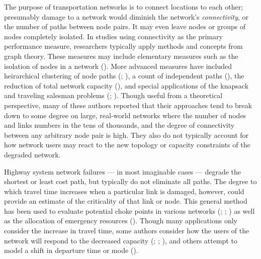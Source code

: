 \documentclass[]{ascelike-new}
\begin{document}
The purpose of transportation networks is to connect locations to each
other; presumably damage to a network would diminish the network's
\emph{connectivity}, or the number of paths between node pairs. It may
even leave nodes or groups of nodes completely isolated. In studies
using connectivity as the primary performance measure, researchers
typically apply methods and concepts from graph theory. These measures
may include elementary measures such as the isolation of nodes in a
network (). More
advanced measures have included heirarchical clustering of node paths
(;
), a count of independent
paths (), the reduction of
total network capacity (), and
special applications of the knapsack and traveling salesman problems
(;
). Though useful
from a theoretical perspective, many of these authors reported that
their approaches tend to break down to some degree on large, real-world
networks where the number of nodes and links numbers in the tens of
thousands, and the degree of connectivity between any arbitrary node
pair is high. They also do not typically account for how network users
may react to the new topology or capacity constraints of the degraded
network.

Highway system network failures --- in most imaginable cases --- degrade
the shortest or least cost path, but typically do not eliminate all
paths. The degree to which travel time increases when a particular link
is damaged, however, could provide an estimate of the criticality of
that link or node. This general method has been used to evaluate
potential choke points in various networks
(;
;
) as well as the allocation
of emergency resources ().
Though many applications only consider the increase in travel time, some
authors consider how the users of the network will respond to the
decreased capacity (;
;
), and others attempt to model a
shift in departure time or mode ().
\end{document}
